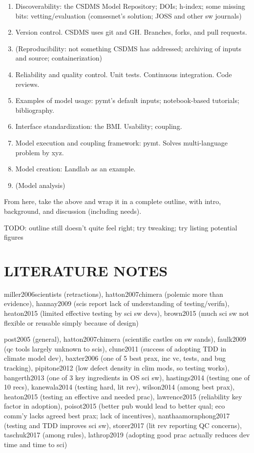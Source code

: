 \documentclass[12pt]{amsart}
\begin{document}
\begin{enumerate}
\item Discoverability: the CSDMS Model Repository; DOIs; h-index; some missing bits: vetting/evaluation (comsesnet's solution; JOSS and other sw journals)
\item Version control. CSDMS uses git and GH. Branches, forks, and pull requests.
\item (Reproducibility: not something CSDMS has addressed; archiving of inputs and source; containerization)
\item Reliability and quality control. Unit tests. Continuous integration. Code reviews.
\item Examples of model usage: pymt's default inputs; notebook-based tutorials; bibliography.
\item Interface standardization: the BMI. Usability; coupling.
\item Model execution and coupling framework: pymt. Solves multi-language problem by xyz.
\item Model creation: Landlab as an example.
\item (Model analysis)
\end{enumerate}

From here, take the above and wrap it in a complete outline, with intro, background, and discussion (including needs).

TODO: outline still doesn't quite feel right; try tweaking; try listing potential figures




\section*{LITERATURE NOTES}


miller2006scientists (retractions), hatton2007chimera (polemic more than evidence), hannay2009 (scis report lack of understanding of testing/verifn), heaton2015 (limited effective testing by sci sw devs), brown2015 (much sci sw not flexible or reusable simply because of design)

post2005 (general), hatton2007chimera (scientific castles on sw sands), faulk2009 (qc tools largely unknown to scis), clune2011 (success of adopting TDD in climate model dev), baxter2006 (one of 5 best prax, inc vc, tests, and bug tracking), pipitone2012 (low defect density in clim mods, so testing works), bangerth2013 (one of 3 key ingredients in OS sci sw), hastings2014 (testing one of 10 recs), kanewala2014 (testing hard, lit rev), wilson2014 (among best prax), heaton2015 (testing an effective and needed prac), lawrence2015 (reliability key factor in adoption), poisot2015 (better pub would lead to better qual; eco comm'y lacks agreed best prax; lack of incentives), nanthaamornphong2017 (testing and TDD improves sci sw), storer2017 (lit rev reporting QC concerns), taschuk2017 (among rules), lathrop2019 (adopting good prac actually reduces dev time and time to sci)
\end{document}
